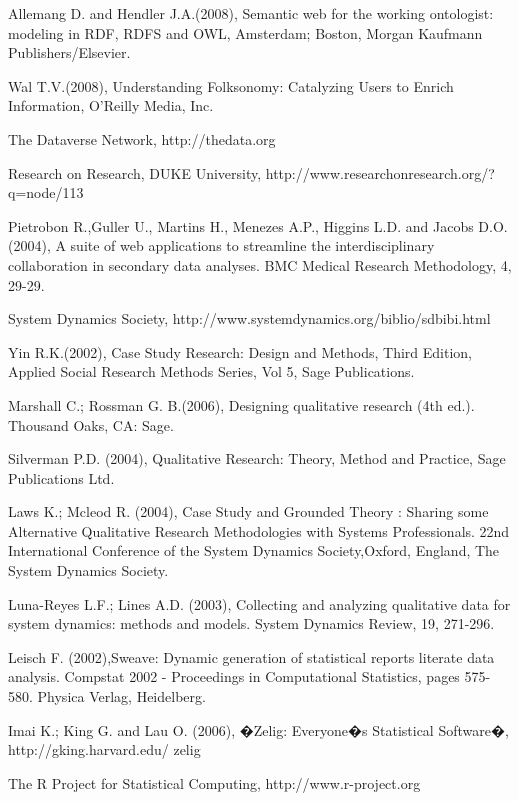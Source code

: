 \documentclass[11pt]{article}
\begin{document}
\begin{thebibliography}{}
Allemang D. and Hendler J.A.(2008), Semantic web for the working ontologist: modeling in RDF, RDFS and OWL, Amsterdam; Boston, Morgan Kaufmann Publishers/Elsevier.

Wal T.V.(2008), Understanding Folksonomy: Catalyzing Users to Enrich Information, O'Reilly Media, Inc.

The Dataverse Network, http://thedata.org

Research on Research, DUKE University, http://www.researchonresearch.org/?q=node/113

 Pietrobon R.,Guller U., Martins H., Menezes A.P., Higgins L.D. and Jacobs D.O.(2004), A suite of web applications to streamline the interdisciplinary collaboration in secondary data analyses. BMC Medical Research Methodology, 4, 29-29.

System Dynamics Society,  http://www.systemdynamics.org/biblio/sdbibi.html

Yin R.K.(2002), Case Study Research: Design and Methods, Third Edition, Applied Social Research Methods Series, Vol 5, Sage Publications.

Marshall C.; Rossman G. B.(2006), Designing qualitative research (4th ed.). Thousand Oaks, CA: Sage.

Silverman P.D. (2004), Qualitative Research: Theory, Method and Practice, Sage Publications Ltd.

Laws K.; Mcleod R. (2004), Case Study and Grounded Theory : Sharing some Alternative Qualitative Research Methodologies with Systems Professionals. 22nd International Conference of the System Dynamics Society,Oxford, England, The System Dynamics Society.

Luna-Reyes L.F.; Lines A.D. (2003), Collecting and analyzing qualitative data for system dynamics: methods and models. System Dynamics Review, 19, 271-296.

Leisch F. (2002),Sweave: Dynamic generation of statistical reports literate data analysis. Compstat 2002 - Proceedings in Computational Statistics, pages 575-580. Physica Verlag, Heidelberg. 

Imai K.; King G. and Lau O. (2006), �Zelig: Everyone�s Statistical Software�, http://gking.harvard.edu/ zelig

The R Project for Statistical Computing, http://www.r-project.org


\end{thebibliography}
\end{document}
